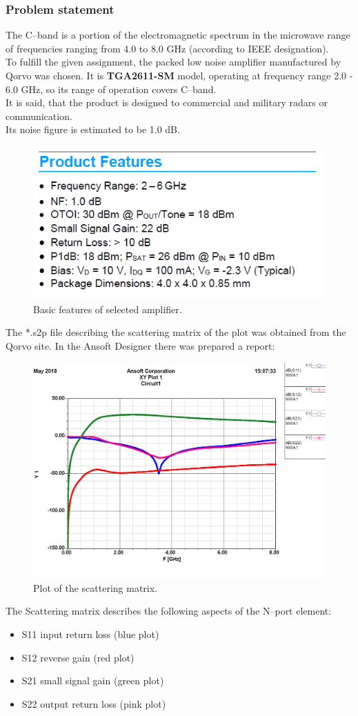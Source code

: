 \documentclass[eng,printmode]{mgr}
\begin{document}
\subsubsection{Problem statement}
The C--band is a portion of the electromagnetic spectrum in the microwave range of frequencies ranging from 4.0 to 8.0 GHz (according to IEEE designation).\\
To fulfill the given assignment, the packed low noise amplifier manufactured by Qorvo was chosen. It is \textbf{TGA2611-SM} model, operating at frequency range 2.0 - 6.0 GHz, so its range of operation covers C--band.
\\
It is said, that the product is designed to commercial and military radars or communication.\\
Its noise figure is estimated to be 1.0 dB.
\begin{figure}[h]
	\centering
	\includegraphics[width=0.3\linewidth]{chip}
	\caption{Basic features of selected amplifier.}
	\label{fig:chip}
\end{figure}

\noindent
The *.s2p file describing the scattering matrix of the plot was obtained from the Qorvo site. In the Ansoft Designer there was prepared a report:
\begin{figure}[h]
	\centering
	\includegraphics[width=0.7\linewidth]{chip-plot}
	\caption{Plot of the scattering matrix.}
	\label{fig:chip-plot}
\end{figure}

The Scattering matrix describes the following aspects of the N--port element:
\begin{itemize}
\item S11 input return loss  (blue plot)
\item S12 reverse gain       (red plot)
\item S21 small signal gain  (green plot)
\item S22 output return loss (pink plot)
\end{itemize}
\end{document}
